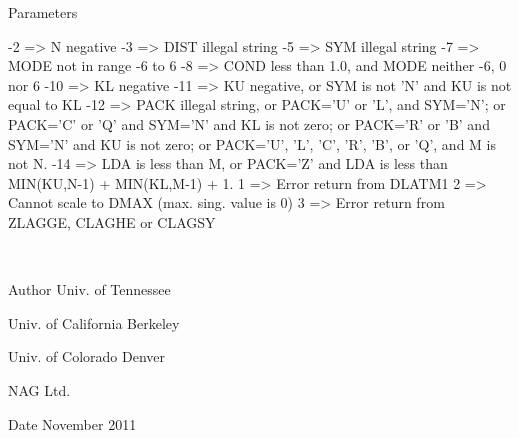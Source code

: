 \begin{DoxyParams}[1]{Parameters}
\begin{DoxyVerb}
            -2 => N negative
            -3 => DIST illegal string
            -5 => SYM illegal string
            -7 => MODE not in range -6 to 6
            -8 => COND less than 1.0, and MODE neither -6, 0 nor 6
           -10 => KL negative
           -11 => KU negative, or SYM is not 'N' and KU is not equal to
                  KL
           -12 => PACK illegal string, or PACK='U' or 'L', and SYM='N';
                  or PACK='C' or 'Q' and SYM='N' and KL is not zero;
                  or PACK='R' or 'B' and SYM='N' and KU is not zero;
                  or PACK='U', 'L', 'C', 'R', 'B', or 'Q', and M is not
                  N.
           -14 => LDA is less than M, or PACK='Z' and LDA is less than
                  MIN(KU,N-1) + MIN(KL,M-1) + 1.
            1  => Error return from DLATM1
            2  => Cannot scale to DMAX (max. sing. value is 0)
            3  => Error return from ZLAGGE, CLAGHE or CLAGSY\end{DoxyVerb}
 \\
\hline
\end{DoxyParams}
\begin{DoxyAuthor}{Author}
Univ. of Tennessee 

Univ. of California Berkeley 

Univ. of Colorado Denver 

N\+A\+G Ltd. 
\end{DoxyAuthor}
\begin{DoxyDate}{Date}
November 2011 
\end{DoxyDate}
\hypertarget{group__complex16__matgen_ga11048512b57a4efb13379143f3b27881}{}
